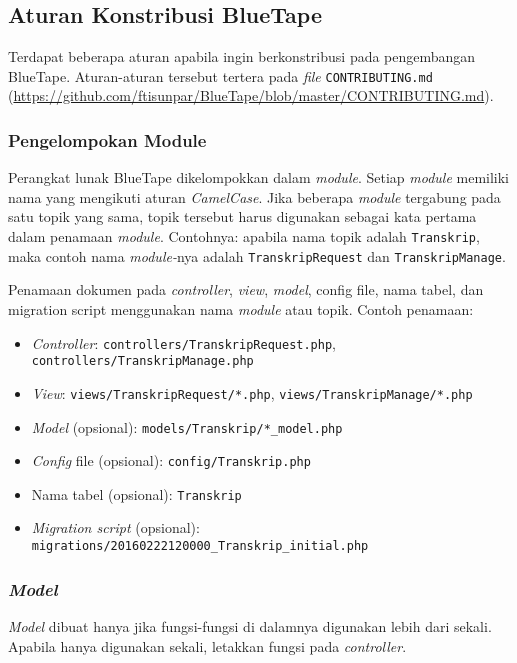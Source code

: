 \subsection{Aturan Konstribusi BlueTape}
	Terdapat beberapa aturan apabila ingin berkonstribusi pada pengembangan BlueTape. Aturan-aturan tersebut tertera pada \textit{file} \texttt{CONTRIBUTING.md} (\url{https://github.com/ftisunpar/BlueTape/blob/master/CONTRIBUTING.md}).

	\subsubsection{Pengelompokan Module}
		Perangkat lunak BlueTape dikelompokkan dalam \textit{module}. Setiap \textit{module} memiliki nama yang mengikuti aturan \textit{CamelCase}. Jika beberapa \textit{module} tergabung pada satu topik yang sama, topik tersebut harus digunakan sebagai kata pertama dalam penamaan \textit{module}. Contohnya: apabila nama topik adalah \texttt{Transkrip}, maka contoh nama \textit{module-}nya adalah \texttt{TranskripRequest} dan \texttt{TranskripManage}.
		
		Penamaan dokumen pada \textit{controller}, \textit{view}, \textit{model}, config file, nama tabel, dan migration script menggunakan nama \textit{module} atau topik. Contoh penamaan:
		\begin{itemize}
			\item \textit{Controller}: \texttt{controllers/TranskripRequest.php}, \texttt{controllers/TranskripManage.php}
			\item \textit{View}: \texttt{views/TranskripRequest/*.php}, \texttt{views/TranskripManage/*.php}
			\item \textit{Model} (opsional): \texttt{models/Transkrip/*\_model.php}
			\item \textit{Config} file (opsional): \texttt{config/Transkrip.php}
			\item Nama tabel (opsional): \texttt{Transkrip}
			\item \textit{Migration script} (opsional): \texttt{migrations/20160222120000\_Transkrip\_initial.php}
		\end{itemize} 
	
	\subsubsection{\textit{Model}}
		\textit{Model} dibuat hanya jika fungsi-fungsi di dalamnya digunakan lebih dari sekali. Apabila hanya digunakan sekali, letakkan fungsi pada \textit{controller}.
	
